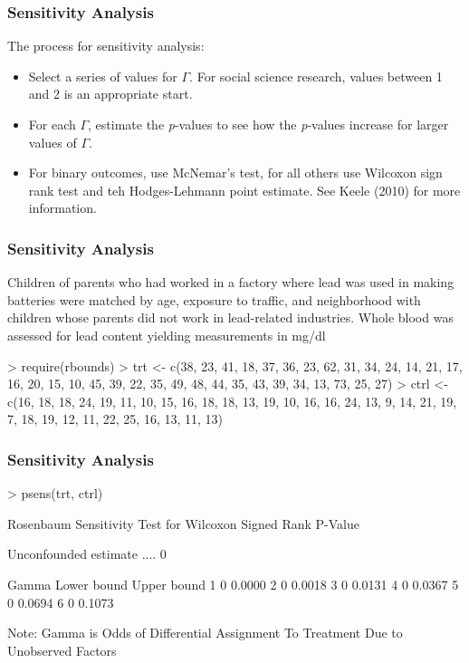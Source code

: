 \documentclass[10pt,slidestop,mathserif,c]{beamer}
\begin{document}
\begin{frame}
    \frametitle{Sensitivity Analysis}
    The process for sensitivity analysis:
    \begin{itemize}
        \item Select a series of values for $\Gamma$. For social science research, values between 1 and 2 is an appropriate start.
        \item For each $\Gamma$, estimate the \textit{p}-values to see how the \textit{p}-values increase for larger values of $\Gamma$.
        \item For binary outcomes, use McNemar's test, for all others use Wilcoxon sign rank test and teh Hodges-Lehmann point estimate. See Keele (2010) for more information.
    \end{itemize}
\end{frame}


\begin{frame}
    \frametitle{Sensitivity Analysis}
    
    Children of parents who had worked in a factory where lead was used in making batteries were matched by age, exposure to traffic, and neighborhood with children whose parents did not work in lead-related industries. Whole blood was assessed for lead content yielding measurements in mg/dl
\begin{Schunk}
\begin{Sinput}
> require(rbounds)
> trt <- c(38, 23, 41, 18, 37, 36, 23, 62, 31, 34, 24, 14, 21, 17, 
            16, 20, 15, 10, 45, 39, 22, 35, 49, 48, 44, 35, 43, 39,
            34, 13, 73, 25, 27)
> ctrl <- c(16, 18, 18, 24, 19, 11, 10, 15, 16, 18, 18, 13, 19, 
             10, 16, 16, 24, 13, 9, 14, 21, 19, 7, 18, 19, 12, 
             11, 22, 25, 16, 13, 11, 13)
\end{Sinput}
\end{Schunk}
\end{frame}


\begin{frame}
    \frametitle{Sensitivity Analysis}
\begin{Schunk}
\begin{Sinput}
> psens(trt, ctrl)
\end{Sinput}
\begin{Soutput}
 Rosenbaum Sensitivity Test for Wilcoxon Signed Rank P-Value 
 
Unconfounded estimate ....  0 

 Gamma Lower bound Upper bound
     1           0      0.0000
     2           0      0.0018
     3           0      0.0131
     4           0      0.0367
     5           0      0.0694
     6           0      0.1073

 Note: Gamma is Odds of Differential Assignment To
 Treatment Due to Unobserved Factors 
\end{Soutput}
\end{Schunk}
\end{frame}
\end{document}
